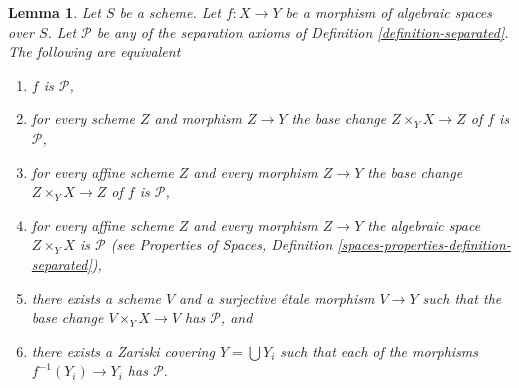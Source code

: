 \documentclass{stacks-project}
\theoremstyle{plain}
\newtheorem{lemma}[subsection]{Lemma}
\theoremstyle{definition}
\theoremstyle{remark}
\numberwithin{equation}{subsection}
\begin{document}
\begin{lemma}
\label{lemma-separated-local}
Let $S$ be a scheme.
Let $f : X \to Y$ be a morphism of algebraic spaces over $S$.
Let $\mathcal{P}$ be any of the separation
axioms of Definition \ref{definition-separated}.
The following are equivalent
\begin{enumerate}
\item $f$ is $\mathcal{P}$,
\item for every scheme $Z$ and morphism $Z \to Y$ the
base change $Z \times_Y X \to Z$ of $f$ is $\mathcal{P}$,
\item for every affine scheme $Z$ and every morphism $Z \to Y$ the
base change $Z \times_Y X \to Z$ of $f$ is $\mathcal{P}$,
\item for every affine scheme $Z$ and every morphism $Z \to Y$ the
algebraic space $Z \times_Y X$ is $\mathcal{P}$ (see
Properties of Spaces, Definition \ref{spaces-properties-definition-separated}),
\item there exists a scheme $V$ and a surjective \'etale morphism
$V \to Y$ such that the base change $V \times_Y X \to V$ has
$\mathcal{P}$, and
\item there exists a Zariski covering $Y = \bigcup Y_i$ such that each
of the morphisms $f^{-1}(Y_i) \to Y_i$ has $\mathcal{P}$.
\end{enumerate}
\end{lemma}
\end{document}
